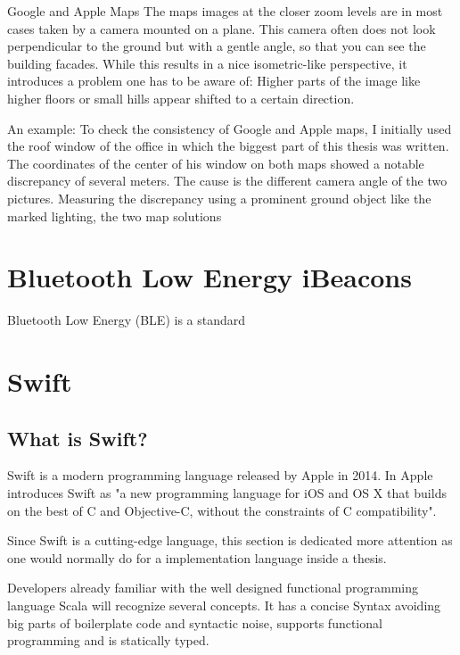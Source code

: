 Google and Apple Maps
The maps images at the closer zoom levels are in most cases taken by a camera mounted on a plane. This camera often does not look perpendicular to the ground but with a gentle angle, so that you can see the building facades.
While this results in a nice isometric-like perspective, it introduces a problem one has to be aware of: Higher parts of the image like higher floors or small hills appear shifted to a certain direction.


An example: To check the consistency of Google and Apple maps, I initially used the roof window of the office in which the biggest part of this thesis was written. The coordinates of the center of his window on both maps showed a notable discrepancy of several meters. The cause is the different camera angle of the two pictures. 
Measuring the discrepancy using a prominent ground object like the marked lighting, the two map solutions 



\section{Bluetooth Low Energy iBeacons}

Bluetooth Low Energy (BLE) is a standard %

\section{Swift}

\subsection{What is Swift?}

Swift is a modern programming language released by Apple in 2014. In \cite{swift-book} Apple introduces Swift as "a new programming language for iOS and OS X that builds on the best of C and Objective-C, without the constraints of C compatibility".

Since Swift is a cutting-edge language, this section is dedicated more attention as one would normally do for a implementation language inside a thesis. 

Developers already familiar with the well designed functional programming language Scala will recognize several concepts. It has a concise Syntax avoiding big parts of boilerplate code and syntactic noise, supports functional programming and is statically typed.

